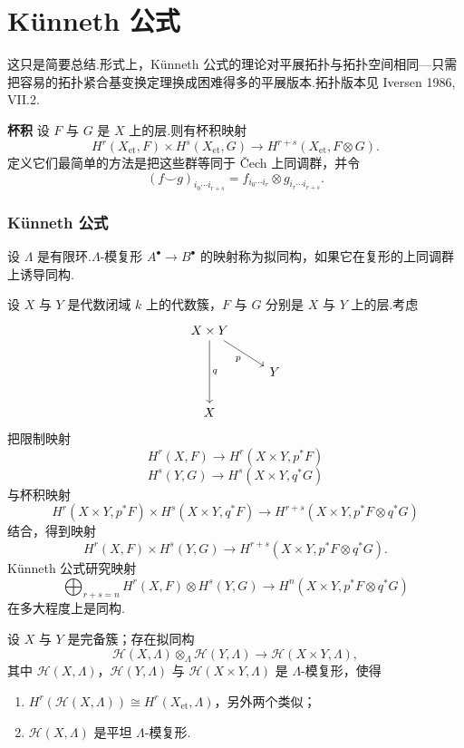 ﻿%
\chapter{K\"unneth 公式}\label{sec:22}

这只是简要总结.形式上，K\"unneth 公式的理论对平展拓扑与拓扑空间相同---只需把容易的拓扑紧合基变换定理换成困难得多的平展版本.拓扑版本见 Iversen 1986, VII.2.

\textbf{杯积} 设 $F$ 与 $G$ 是 $X$ 上的层.则有杯积映射
\[
H^{r}(X_{\mathrm{et}}, F) \times H^{s}(X_{\mathrm{et}}, G) \to H^{r+s}(X_{\mathrm{et}}, F \otimes G).
\]
定义它们最简单的方法是把这些群等同于 \v{C}ech 上同调群，并令
\[
(f \smile g)_{i_0 \cdots i_{r+s}} = f_{i_0 \cdots i_r} \otimes g_{i_r \cdots i_{r+s}}.
\]

\subsection*{K\"unneth 公式}

设 $\Lambda$ 是有限环.$\Lambda$-模复形 $A^{\bullet} \to B^{\bullet}$ 的映射称为拟同构，如果它在复形的上同调群上诱导同构.

设 $X$ 与 $Y$ 是代数闭域 $k$ 上的代数簇，$F$ 与 $G$ 分别是 $X$ 与 $Y$ 上的层.考虑
\[
\begin{tikzcd}
X \times Y \arrow[rd, "p"'] \arrow[dd, "q"] & \\
& Y \\
X &
\end{tikzcd}
\]
把限制映射
\[
H^{r}(X, F) \to H^{r}(X \times Y, p^{*}F)
\]
\[
H^{s}(Y, G) \to H^{s}(X \times Y, q^{*}G)
\]
与杯积映射
\[
H^{r}(X \times Y, p^{*}F) \times H^{s}(X \times Y, q^{*}F) \to H^{r+s}(X \times Y, p^{*}F \otimes q^{*}G)
\]
结合，得到映射
\[
H^{r}(X, F) \times H^{s}(Y, G) \to H^{r+s}(X \times Y, p^{*}F \otimes q^{*}G).
\]
K\"unneth 公式研究映射
\[
\bigoplus_{r+s=n} H^{r}(X, F) \otimes H^{s}(Y, G) \to H^{n}(X \times Y, p^{*}F \otimes q^{*}G)
\]
在多大程度上是同构.

\begin{theorem}\label{thm:22.1}
设 $X$ 与 $Y$ 是完备簇；存在拟同构
\[
\mathcal{H}(X, \Lambda) \otimes_{\Lambda} \mathcal{H}(Y, \Lambda) \to \mathcal{H}(X \times Y, \Lambda),
\]
其中 $\mathcal{H}(X, \Lambda)$，$\mathcal{H}(Y, \Lambda)$ 与 $\mathcal{H}(X \times Y, \Lambda)$ 是 $\Lambda$-模复形，使得
\begin{enumerate}
  \item $H^{r}(\mathcal{H}(X, \Lambda)) \cong H^{r}(X_{\mathrm{et}}, \Lambda)$，另外两个类似；
  \item $\mathcal{H}(X, \Lambda)$ 是平坦 $\Lambda$-模复形.
\end{enumerate}
\end{theorem}

